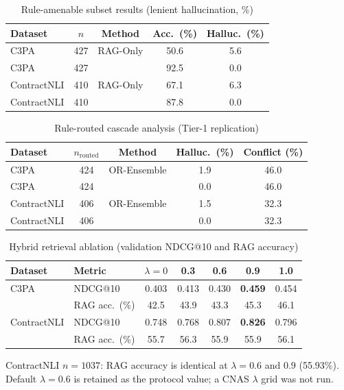 \begin{table}[t]
\centering
\caption{Rule-amenable subset results (lenient hallucination, \%)}
\label{tab:strata}
\small
\begin{tabular}{@{}lcccc@{}}
\toprule
Dataset & $n$ & Method & Acc.\ (\%) & Halluc.\ (\%) \\
\midrule
C3PA          & 427 & RAG-Only & 50.6 & 5.6 \\
C3PA          & 427 & \HRAG{}  & 92.5 & 0.0 \\
ContractNLI   & 410 & RAG-Only & 67.1 & 6.3 \\
ContractNLI   & 410 & \HRAG{}  & 87.8 & 0.0 \\
\bottomrule
\end{tabular}
\end{table}

\begin{table}[t]
\centering
\caption{Rule-routed cascade analysis (Tier-1 replication)}
\label{tab:cascade}
\small
\begin{tabular}{@{}lcccc@{}}
\toprule
Dataset & $n_{\mathrm{routed}}$ & Method & Halluc.\ (\%) & Conflict (\%) \\
\midrule
C3PA        & 424 & OR-Ensemble & 1.9 & 46.0 \\
C3PA        & 424 & \HRAG{}     & 0.0 & 46.0 \\
ContractNLI & 406 & OR-Ensemble & 1.5 & 32.3 \\
ContractNLI & 406 & \HRAG{}     & 0.0 & 32.3 \\
\bottomrule
\end{tabular}
\end{table}

\begin{table}[t]
\centering
\caption{Hybrid retrieval ablation (validation NDCG@10 and RAG accuracy)}
\label{tab:lambda}
\small
\begin{tabular}{@{}llccccc@{}}
\toprule
Dataset & Metric & $\lambda{=}0$ & 0.3 & 0.6 & 0.9 & 1.0 \\
\midrule
C3PA        & NDCG@10 & 0.403 & 0.413 & 0.430 & \textbf{0.459} & 0.454 \\
            & RAG acc.\ (\%) & 42.5 & 43.9 & 43.3 & 45.3 & 46.1 \\
ContractNLI & NDCG@10 & 0.748 & 0.768 & 0.807 & \textbf{0.826} & 0.796 \\
            & RAG acc.\ (\%) & 55.7 & 56.3 & 55.9 & 55.9 & 56.1 \\
\bottomrule
\end{tabular}
\par\vspace{0.3em}
{\footnotesize ContractNLI $n{=}1037$: RAG accuracy is identical at $\lambda{=}0.6$ and $0.9$ (55.93\%). Default $\lambda{=}0.6$ is retained as the protocol value; a CNAS $\lambda$ grid was not run.}
\end{table}
